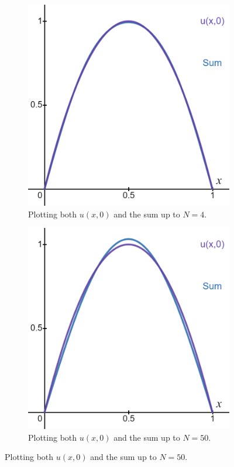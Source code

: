 \documentclass[12pt]{article} %
\begin{document}
\begin{solution}
\begin{enumerate}[(a)]
\begin{figure}[H]
\begin{subfigure}[b]{0.3\textwidth}
        \includegraphics[width=\textwidth]{figures/sum_n4.png}
        \caption{Plotting both $u(x,0)$ and the sum up to $N=4$.}
    \end{subfigure}
    \hfill
    \begin{subfigure}[b]{0.3\textwidth}
        \centering
        \includegraphics[width=\textwidth]{figures/sum_n1.png}
        \caption{Plotting both $u(x,0)$ and the sum up to $N=50$.}
    \end{subfigure}
    \end{figure}
\end{enumerate}
\end{solution}
\end{document}
